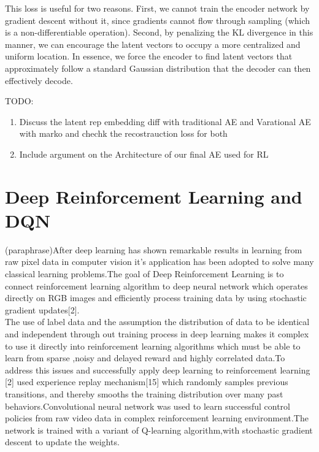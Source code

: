 This loss is useful for two reasons. First, we cannot train the encoder network by gradient descent without it, since gradients cannot flow through sampling (which is a non-differentiable operation). Second, by penalizing the KL divergence in this manner, we can encourage the latent vectors to occupy a more centralized and uniform location. In essence, we force the encoder to find latent vectors that approximately follow a standard Gaussian distribution that the decoder can then effectively decode.

TODO:
\begin{enumerate}
		\item Discuss the latent rep embedding diff with traditional AE and Varational AE with marko and chechk the recostrauction loss for both
		
		\item Include argument on the Architecture  of our final AE used for RL
	\end{enumerate}


\section{Deep Reinforcement Learning and DQN}

(paraphrase)After deep learning  has shown remarkable results in learning from raw pixel data in computer vision it's application has been adopted to solve many classical learning problems.The goal of Deep Reinforcement Learning is to connect reinforcement learning algorithm to deep neural network which operates directly on RGB images and efficiently process training data by using stochastic gradient updates[2].\\

The use of label data and the assumption the distribution of data to be identical and independent through out training process in deep learning makes it complex to use it directly into reinforcement learning algorithms which must be able to learn from sparse ,noisy and delayed reward and highly correlated data.To address this issues and successfully apply deep learning to reinforcement learning [2] used experience replay mechanism[15] which randomly samples previous transitions, and thereby smooths the training distribution over many past behaviors.Convolutional neural network was used to  learn successful control policies from raw video data in complex reinforcement learning environment.The network is trained with a variant of Q-learning algorithm,with stochastic gradient descent to update the weights.

